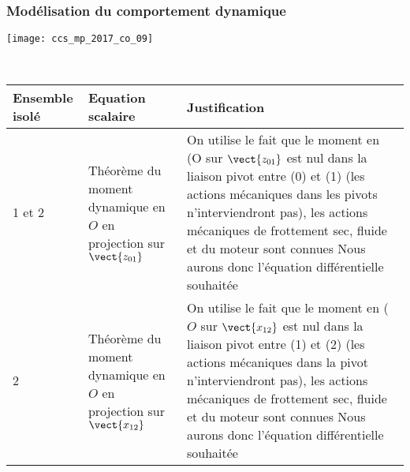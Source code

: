 \subsubsection{Modélisation du comportement dynamique}

\ifprof
\begin{corrige}
\begin{center}

\texttt{[image: ccs\_mp\_2017\_co\_09]}

\end{center}
\end{corrige}
\else
\fi


\ifprof
\begin{corrige} ~\\
\begin{center}
\begin{tabular}{lp{5cm}p{7cm}}
\hline
\textbf{Ensemble isolé} & \textbf{Equation scalaire} & \textbf{Justification} \\
\hline
 1 et 2 & 
Théorème du moment dynamique en $O$ en projection sur $\vect{z_{01}}$ 
& On utilise le fait que le moment en (O sur $\vect{z_{01}}$ est nul dans la liaison pivot entre (0) et (1) (les actions mécaniques dans les pivots n’interviendront pas), les actions mécaniques de frottement sec, fluide et du moteur sont connues Nous aurons donc l’équation différentielle souhaitée \\
 2 &	
Théorème du moment dynamique en $O$ en projection sur $\vect{x_{12}}$ 
&On utilise le fait que le moment en ($O$ sur $\vect{x_{12}}$ est nul dans la liaison pivot entre (1) et (2) (les actions mécaniques dans la pivot n’interviendront pas), les actions mécaniques de frottement sec, fluide et du moteur sont connues Nous aurons donc l’équation différentielle souhaitée \\
\hline
\end{tabular}
\end{center}
\end{corrige}
\else
\fi



